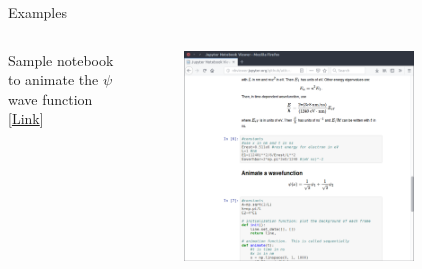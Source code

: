 \documentclass[11pt,t]{beamer}
\begin{document}
\begin{frame}[fragile]{Examples}  

	\begin{columns}[t]
		\begin{column}{.3\textwidth}
		Sample notebook to animate the $\psi$ wave function [\href{http://nbviewer.jupyter.org/github/atitus/presentations/blob/master/brynmawr-05-19-17/qm-psi-infinite-sq-well.ipynb}{Link}]
	
 
		\end{column}
		\begin{column}{.7\textwidth}
			\vspace{-55pt}
			\begin{figure}
			\centering
			\includegraphics[width=0.80\textwidth]{jupyter_ex_wave}
			
			\end{figure}
		\end{column}
	\end{columns}	
		
\end{frame}
\end{document}
